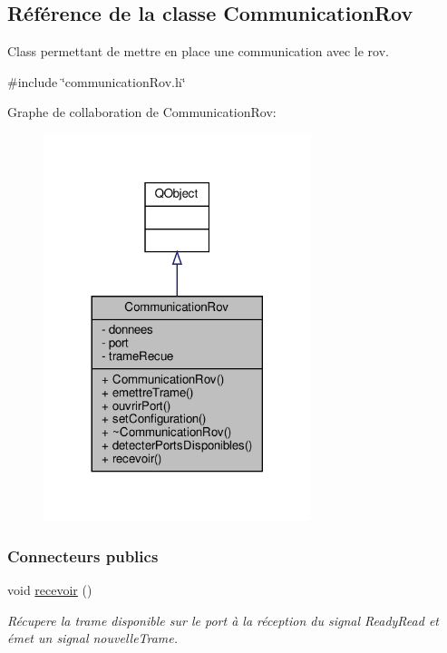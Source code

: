\hypertarget{class_communication_rov}{}\subsection{Référence de la classe Communication\+Rov}
\label{class_communication_rov}


Class permettant de mettre en place une communication avec le rov.  




{\ttfamily \#include \char`\"{}communication\+Rov.\+h\char`\"{}}



Graphe de collaboration de Communication\+Rov\+:
\nopagebreak
\begin{figure}[H]
\begin{center}
\leavevmode
\includegraphics[width=221pt]{class_communication_rov__coll__graph}
\end{center}
\end{figure}
\subsubsection*{Connecteurs publics}
\begin{DoxyCompactItemize}
\item 
void \hyperlink{class_communication_rov_a75de69ca01c849f760d7efea1b2722b9}{recevoir} ()
\begin{DoxyCompactList}\small\item\em Récupere la trame disponible sur le port à la réception du signal Ready\+Read et émet un signal nouvelle\+Trame. \end{DoxyCompactList}\end{DoxyCompactItemize}
